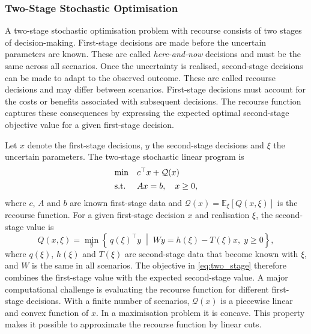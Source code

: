 \subsubsection{Two-Stage Stochastic Optimisation}
\label{subsec:two_stage_stochastic_optimisation}

A two-stage stochastic optimisation problem with recourse consists of two stages of decision-making. First-stage decisions are made before the uncertain parameters are known. These are called \textit{here-and-now} decisions and must be the same across all scenarios. Once the uncertainty is realised, second-stage decisions can be made to adapt to the observed outcome. These are called recourse decisions and may differ between scenarios. %
First-stage decisions must account for the costs or benefits associated with subsequent decisions. The recourse function captures these consequences by expressing the expected optimal second-stage objective value for a given first-stage decision.

Let $x$ denote the first-stage decisions, $y$ the second-stage decisions and $\xi$ the uncertain parameters. The two-stage stochastic linear program is
\begin{equation}
\begin{array}{@{}l@{\quad}l@{}}
\min & c^{\top}x + \mathcal{Q}(x)\\[1ex]
\text{s.t.} & Ax = b,\quad x \ge 0,
\end{array}
\label{eq:two_stage}
\end{equation}
where $c$, $A$ and $b$ are known first-stage data and $\mathcal{Q}(x)=\mathbb{E}_{\xi}\left[Q(x,\xi)\right]$ is the recourse function. For a given first-stage decision $x$ and realisation $\xi$, the second-stage value is
\begin{equation}
Q(x,\xi)=\min_{y}\left\{\,q(\xi)^{\top}y \;\middle|\; Wy = h(\xi)-T(\xi)x,\; y\ge 0\right\},
\label{eq:second_stage}
\end{equation}
where $q(\xi)$, $h(\xi)$ and $T(\xi)$ are second-stage data that become known with $\xi$, and $W$ is the same in all scenarios. %
The objective in \eqref{eq:two_stage} therefore combines the first-stage value with the expected second-stage value. A major computational challenge is evaluating the recourse function for different first-stage decisions. %
With a finite number of scenarios, $\mathcal{Q}(x)$ is a piecewise linear and convex function of $x$. In a maximisation problem it is concave. %
This property makes it possible to approximate the recourse function by linear cuts.

